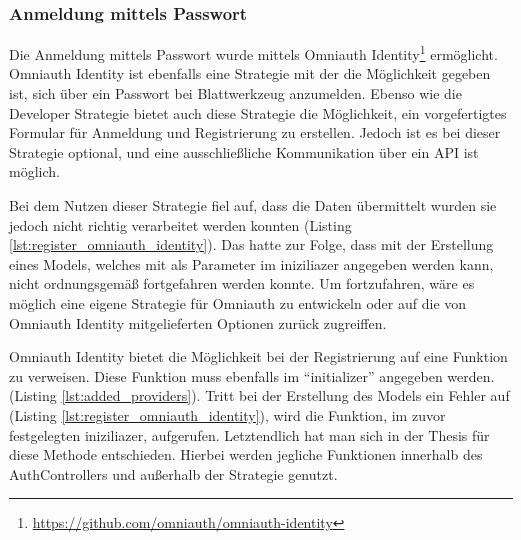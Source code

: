 

\subsubsection{Anmeldung mittels Passwort}
\label{sec:sever-sign-in-password}
Die Anmeldung mittels Passwort wurde mittels Omniauth Identity\footnote{\url{https://github.com/omniauth/omniauth-identity}} ermöglicht. Omniauth Identity ist ebenfalls eine Strategie mit der die Möglichkeit gegeben ist, sich über ein Passwort bei Blattwerkzeug anzumelden. Ebenso wie die Developer Strategie bietet auch diese Strategie die Möglichkeit, ein vorgefertigtes Formular für Anmeldung und Registrierung zu erstellen. Jedoch ist es bei dieser Strategie optional, und eine ausschlie{\ss}liche Kommunikation über ein API ist möglich.

Bei dem Nutzen dieser Strategie fiel auf, dass die Daten übermittelt wurden sie jedoch nicht richtig verarbeitet werden konnten (Listing \ref{lst:register_omniauth_identity}). Das hatte zur Folge, dass mit der Erstellung eines Models, welches mit als Parameter im iniziliazer angegeben werden kann, nicht ordnungsgemä{\ss} fortgefahren werden konnte. Um fortzufahren, wäre es möglich eine eigene Strategie für Omniauth zu entwickeln oder auf die von Omniauth Identity mitgelieferten Optionen zurück zugreiffen.

Omniauth Identity bietet die Möglichkeit bei der Registrierung auf eine Funktion zu verweisen. Diese Funktion muss ebenfalls im \enquote{initializer} angegeben werden. (Listing \ref{lst:added_providers}). Tritt bei der Erstellung des Models ein Fehler auf (Listing \ref{lst:register_omniauth_identity}), wird die Funktion, im zuvor festgelegten iniziliazer, aufgerufen. Letztendlich hat man sich in der Thesis für diese Methode entschieden. Hierbei werden jegliche Funktionen innerhalb des AuthControllers und au{\ss}erhalb der Strategie genutzt.


\begin{minipage}{\textwidth}
	
\end{minipage}



